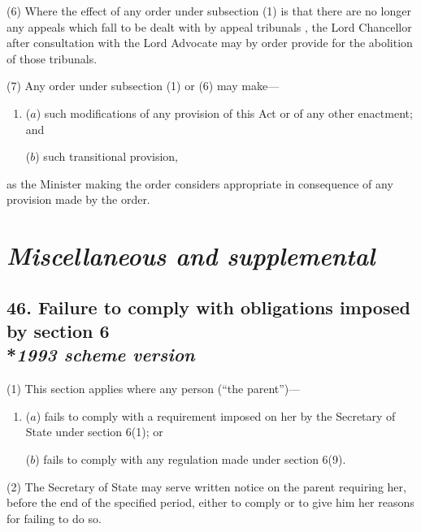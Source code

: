 \documentclass[12pt,a4paper]{article}
\begin{document}
(6) Where the effect of any order under subsection (1)  is that there are no longer any appeals which fall to be dealt with by 
appeal tribunals%
, the Lord Chancellor after consultation with the Lord Advocate may by order provide for the abolition of those tribunals.

(7) Any order under subsection (1)  or (6)  may make—
\begin{enumerate}\item[]
($a$) such modifications of any provision of this Act or of any other enactment; and

($b$) such transitional provision,
\end{enumerate}
as the Minister making the order considers appropriate in consequence of any provision made by the order.


\section{\itshape Miscellaneous and supplemental}

\subsection[46. Failure to comply with obligations imposed by section 6 --- \emph{1993 scheme version}]{46. Failure to comply with obligations imposed by section 6\\*\emph{1993 scheme version}}

(1) This section applies where any person (“the parent”)—
\begin{enumerate}\item[]
($a$) fails to comply with a requirement imposed on her by the Secretary of State under section 6(1); or

($b$) fails to comply with any regulation made under section 6(9).
\end{enumerate}

(2) 
The Secretary of State  %
may serve written notice on the parent requiring her, before the end of the specified period, either to comply or to give him her reasons for failing to do so.
\end{document}

